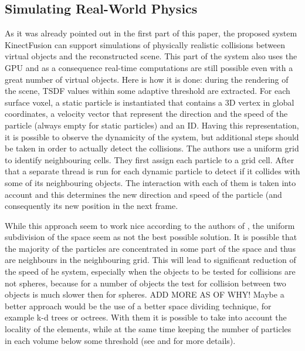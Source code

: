 \documentclass[12pt, a4paper]{article}
\theoremstyle{plain}
\begin{document}
  \subsection{Simulating Real-World Physics} %
  \label{sub:Simulating Real-World Physics}
    As it was already pointed out in the first part of this paper, the proposed
    system KinectFusion can support simulations of physically realistic
    collisions between virtual objects and the reconstructed scene. This part of
    the system also uses the GPU and as a consequence real-time computations are
    still possible even with a great number of virtual objects. Here is how it
    is done: during the rendering of the scene, TSDF values within some adaptive
    threshold are extracted. For each surface voxel, a static particle is
    instantiated that contains a 3D vertex in global coordinates, a velocity
    vector that represent the direction and the speed of the particle (always
    empty for static particles) and an ID. Having this representation, it is
    possible to observe the dynamicity of the system, but additional steps
    should be taken in order to actually detect the collisions. The authors use
    a uniform grid to identify neighbouring cells. They first assign each
    particle to a grid cell. After that a separate thread is run for each
    dynamic particle to detect if it collides with some of its neighbouring
    objects. The interaction with each of them is taken into account and this
    determines the new direction and speed of the particle (and consequently its
    new position in the next frame. 

    While this approach seem to work nice according to the authors of
    \cite{kinectfusion}, the uniform subdivision of the space seem as not the
    best possible solution. It is possible that the majority of the particles
    are concentrated in some part of the space and thus are neighbours in the
    neighbouring grid. This will lead to significant reduction of the speed of
    he system, especially when the objects to be tested for collisions are not
    spheres, because for a number of objects the test for collision between two
    objects is much slower then for spheres. ADD MORE AS OF WHY! Maybe a better approach would be the use of a better space
    dividing technique, for example k-d trees or octrees. With them it is
    possible to take into account the locality of the elements, while at the
    same time keeping the number of particles in each volume below some
    threshold (see \cite{fast-collision-detection} and
    \cite{collision-detection-based-on-partitioning} for more details).
\end{document}
